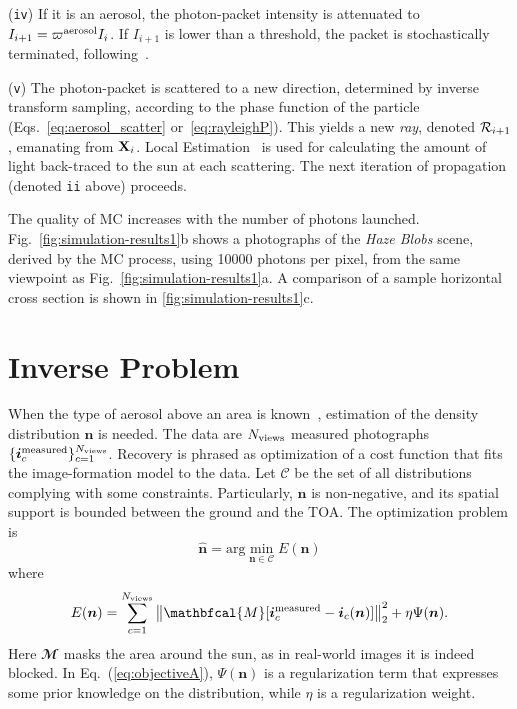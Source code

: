 \documentclass[10pt,letterpaper]{article}
\newcommand{\argmin}{\mathrm{arg}\min}
\newcommand{\vect}[1]{\bm{#1}}
\newcommand{\MaskSun}{\mathbfcal{M}}
\newcommand{\DistSet}{\mathcal{C}}
\newcommand{\DistUnknown}{\vect{n}}
\newcommand{\DistEstimated}{\hat{\vect{n}}}
\newcommand{\CostFunc}[1]{E(#1)}
\begin{document}
\noindent ({\tt iv}) If it is an aerosol, the photon-packet intensity
is attenuated to $I_{i+1}=\varpi^{\rm aerosol}I_{i}$. If $I_{i+1}$ is
lower than a threshold, the packet is stochastically terminated,
following~\cite{Iwabuchi2006}.

\noindent ({\tt v}) The photon-packet is scattered to a new direction,
determined by inverse transform sampling, according to the phase
function of the particle (Eqs.~\ref{eq:aerosol_scatter}
or~\ref{eq:rayleighP}). This yields a new {\em ray}, denoted ${\cal
  R}_{i+1}$, emanating from ${\bf X}_{i}$. Local
Estimation~\cite{marshak20053d} is used for calculating the amount of
light back-traced to the sun at each scattering. The next iteration of
propagation (denoted {\tt ii} above) proceeds.


The quality of MC increases with the number of photons launched.
Fig.~\ref{fig:simulation-results1}b shows a photographs of the {\em
  Haze Blobs} scene, derived by the MC process, using \num{10000}
photons per pixel, from the same viewpoint as
Fig.~\ref{fig:simulation-results1}a.  A comparison of a sample
horizontal cross section is shown in \cref{fig:simulation-results1}c.




\section{Inverse Problem}
\label{sec:inverse-problem}

When the type of aerosol above an area is known~\cite{Martonchik2009},
estimation of the density distribution $\DistUnknown$ is needed. The
data are $N_{\rm views}$ measured photographs $\{ {\bm i}^{\rm
  measured}_c\}_{c=1}^{N_{\rm views}}$. Recovery is phrased as
optimization of a cost function that fits the image-formation model to
the data. Let $\DistSet$ be the set of all distributions complying
with some constraints.  Particularly, $\DistUnknown$ is non-negative,
and its spatial support is bounded between the ground and the TOA. The
optimization problem is
\begin{equation}
  \label{eq:minobjectiveA}
  \DistEstimated =
  \argmin_{\DistUnknown \in \DistSet} \CostFunc{\DistUnknown}
\end{equation}
where
\begin{equation}
  \label{eq:objectiveA}
  \CostFunc{\DistUnknown}
  = \sum_{c=1}^{N_{\rm views}}
  \left\|
    \MaskSun[{\bm i}^{\rm measured}_c - {\bm i}_c({\bm n})]
  \right\|^2_2  + \eta \Psi({\bm n}).
\end{equation}
Here $\MaskSun$ masks the area around the sun, as in real-world images
it is indeed blocked.  In Eq.~(\ref{eq:objectiveA}), $\Psi({\bm n})$
is a regularization term that expresses some prior knowledge on the
distribution, while $\eta$ is a regularization weight.
\end{document}

